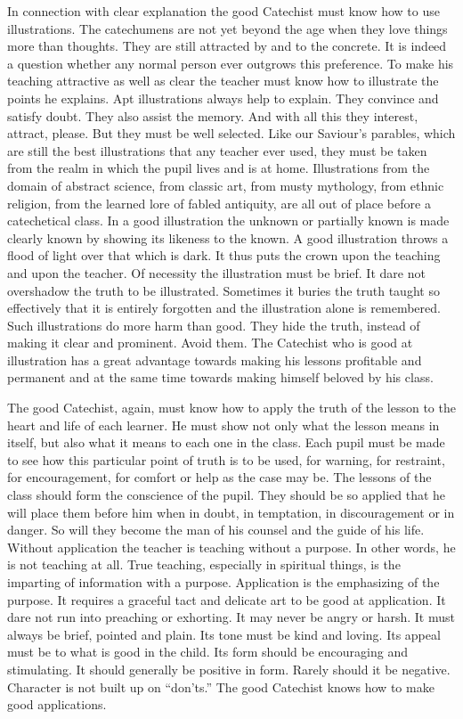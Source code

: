  In connection with clear explanation the good Catechist must know how to use illustrations. The catechumens are not yet beyond the age when they love things more than thoughts. They are still attracted by and to the concrete. It is indeed a question whether any normal person ever outgrows this preference. To make his teaching attractive as well as clear the teacher must know how to illustrate the points he explains. Apt illustrations always help to explain. They convince and satisfy doubt. They also assist the memory. And with all this they interest, attract, please. But they must be well selected. Like our Saviour’s parables, which are still the best illustrations that any teacher ever used, they must be taken from the realm in which the pupil lives and is at home. Illustrations from the domain of
abstract science, from classic art, from musty mythology, from ethnic religion, from the learned lore of fabled antiquity, are all out of place before a catechetical class. In a good illustration the unknown or partially known is made clearly known by showing its likeness to the known. A good illustration throws a flood of light over that which is dark. It thus puts the crown upon the teaching and upon the teacher. Of necessity the illustration must be brief. It dare not overshadow the truth to be illustrated. Sometimes it buries the truth taught so effectively that it is entirely forgotten and the illustration alone is remembered. Such illustrations do more harm than good. They hide the truth, instead of making it clear and prominent. Avoid them. The Catechist who is good at illustration has a great advantage towards making his lessons profitable and permanent and at the same time towards making himself beloved by his class.

 The good Catechist, again, must know how to apply the truth of the lesson to the heart and life of each learner. He must show not only what the lesson means in itself, but also what it means to each one in the class. Each pupil must be made to see how this particular point of truth is to be used, for warning, for restraint, for encouragement, for comfort or help as the case may be. The lessons of the class should form the conscience of the pupil.
They should be so applied that he will place them before him when in doubt, in temptation, in discouragement or in danger. So will they become the man of his counsel and the guide of his life. Without application the teacher is teaching without a purpose. In other words, he is not teaching at all. True teaching, especially in spiritual things, is the imparting of information with a purpose. Application is the emphasizing of the purpose. It requires a graceful tact and delicate art to be good at application. It dare not run into preaching or exhorting. It may never be angry or harsh. It must always be brief, pointed and plain. Its tone must be kind and loving. Its appeal must be to what is good in the child. Its form should be encouraging and stimulating. It should generally be positive in form. Rarely should it be negative. Character is not built up on “don’ts.” The good Catechist knows how to make good applications.

